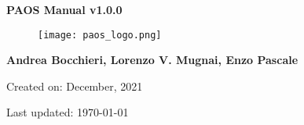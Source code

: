 

\begin{titlepage}

    \centering

    \vspace*{30mm} %
    \textbf{\Huge {PAOS Manual v1.0.0}}

    \vspace{20mm}
    \begin{figure}[!h]
        \centering
        \texttt{[image: paos\_logo.png]}
        \label{fig:paos_logo}
    \end{figure}

    \vspace{25mm}
    \Large \textbf{{Andrea Bocchieri, Lorenzo V. Mugnai, Enzo Pascale}}

    \vspace*{8mm}
    \small Created on: December, 2021

    \vspace{2mm}
    \small Last updated: \MonthYearFormat\today


\end{titlepage}

\clearpage
{}
\tableofcontents
\listoffigures
\listoftables
\clearpage
{}
